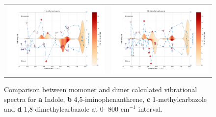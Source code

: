 \begin{figure}[H]
\begin{center}
{\begin{tabular}{c c}
				\includegraphics[scale=0.3]{image/P2-11c} & \includegraphics[scale=0.3]{image/P2-11d}\\
		\end{tabular}}
	\end{center}
		\caption{Comparison between momoner and dimer calculated vibrational spectra for \textbf{a} Indole, \textbf{b} 4,5-iminophenanthrene, \textbf{c} 1-methylcarbazole and \textbf{d} 1,8-dimethylcarbazole at 0- 800 cm$^{-1}$ interval.} \label{figP2-11ad}
	\end{figure}
	
